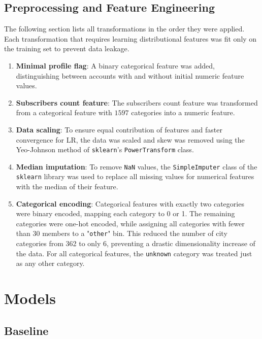 \documentclass[twocolumn]{article}
\begin{document}
\subsection{Preprocessing and Feature Engineering}

The following section lists all transformations in the order they were applied. Each transformation that requires learning distributional features was fit only on the training set to prevent data leakage.

\begin{enumerate}[itemsep=1pt, parsep=0pt]
    \item \textbf{Minimal profile flag}: A binary categorical feature was added, distinguishing between accounts with and without initial numeric feature values. 

    \item \textbf{Subscribers count feature}: The subscribers count feature was transformed from a categorical feature with $1597$ categories into a numeric feature.

    \item \textbf{Data scaling}: To ensure equal contribution of features and faster convergence for LR, the data was scaled and skew was removed using the Yeo-Johnson method of \texttt{sklearn}'s \texttt{PowerTransform} class. \parencite{yeoNewFamilyPower2000}

    \item \textbf{Median imputation}: To remove \texttt{NaN} values, the \texttt{SimpleImputer} class of the \texttt{sklearn} library was used to replace all missing values for numerical features with the median of their feature.

    \item \textbf{Categorical encoding}: Categorical features with exactly two categories were binary encoded, mapping each category to 0 or 1. The remaining categories were one-hot encoded, while assigning all categories with fewer than 30 members to a "\texttt{other}" bin. This reduced the number of city categories from 362 to only 6, preventing a drastic dimensionality increase of the data. For all categorical features, the \texttt{unknown} category was treated just as any other category.
\end{enumerate}

\section{Models}

\subsection{Baseline}
\end{document}
